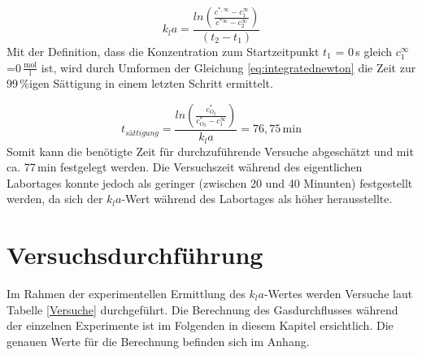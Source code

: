 \documentclass[12pt,liststotoc]{report}
\begin{document}
\begin{equation}
\label{eq:integratednewton}
 k_la = \frac{ln\left(\frac{c^{*,\infty} - c^{\infty}_1 }{c^{*\infty} - c^{\infty}_2}\right)}{(t_2 - t_1)}   
\end{equation}
\noindent
Mit der Definition, dass die Konzentration zum Startzeitpunkt $t_1$ = 0\,s gleich $c^{\infty}_1$=0\,$\frac{\text{mol}}{\text{l}}$ ist, wird durch Umformen der Gleichung \ref{eq:integratednewton} die Zeit zur 99\,$\%$igen Sättigung in einem letzten Schritt ermittelt.

\begin{equation}
    t_{sättigung} = \frac{ln\left(\frac{c^{*}_{O_2}}{c^{*}_{O_2}-c^{\infty}_1}\right)}{k_la} = 76,75\,\text{min}
\end{equation}
\noindent
Somit kann die benötigte Zeit für durchzuführende Versuche abgeschätzt und mit ca. 77\,min festgelegt werden. Die Versuchszeit während des eigentlichen Labortages konnte jedoch als geringer (zwischen 20 und 40 Minunten) festgestellt werden, da sich der $k_la$-Wert während des Labortages als höher herausstellte. 

\chapter{Versuchsdurchführung}
\label{sec:versuchsdurchfuehrung}


Im Rahmen der experimentellen Ermittlung des $k_la$-Wertes werden Versuche laut Tabelle \ref{Versuche} durchgeführt. Die Berechnung des Gasdurchflusses während der einzelnen Experimente ist im Folgenden in diesem Kapitel ersichtlich. Die genauen Werte für die Berechnung befinden sich im Anhang. 
\end{document}
